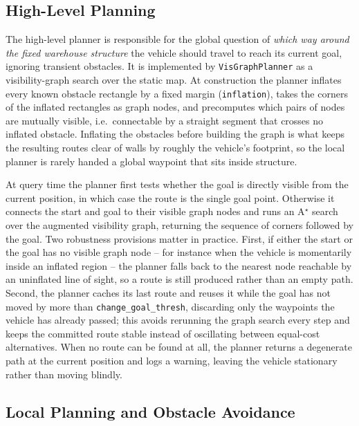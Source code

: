 \subsection{High-Level Planning}
\label{subsec:controllers-highlevel}

The high-level planner is responsible for the global question of \emph{which way around the fixed warehouse structure} the vehicle should travel to reach its current goal, ignoring transient obstacles. It is implemented by \texttt{VisGraphPlanner} as a visibility-graph search over the static map. At construction the planner inflates every known obstacle rectangle by a fixed margin (\texttt{inflation}), takes the corners of the inflated rectangles as graph nodes, and precomputes which pairs of nodes are mutually visible, i.e.\ connectable by a straight segment that crosses no inflated obstacle. Inflating the obstacles before building the graph is what keeps the resulting routes clear of walls by roughly the vehicle's footprint, so the local planner is rarely handed a global waypoint that sits inside structure.

At query time the planner first tests whether the goal is directly visible from the current position, in which case the route is the single goal point. Otherwise it connects the start and goal to their visible graph nodes and runs an A$^\star$ search over the augmented visibility graph, returning the sequence of corners followed by the goal. Two robustness provisions matter in practice. First, if either the start or the goal has no visible graph node -- for instance when the vehicle is momentarily inside an inflated region -- the planner falls back to the nearest node reachable by an uninflated line of sight, so a route is still produced rather than an empty path. Second, the planner caches its last route and reuses it while the goal has not moved by more than \texttt{change\_goal\_thresh}, discarding only the waypoints the vehicle has already passed; this avoids rerunning the graph search every step and keeps the committed route stable instead of oscillating between equal-cost alternatives. When no route can be found at all, the planner returns a degenerate path at the current position and logs a warning, leaving the vehicle stationary rather than moving blindly.

\subsection{Local Planning and Obstacle Avoidance}
\label{subsec:controllers-lowlevel}

